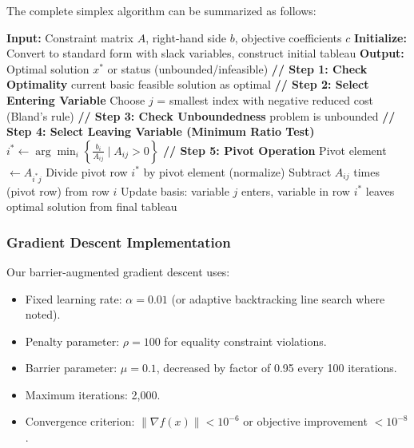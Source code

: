 \documentclass[11pt]{article}
\begin{document}
The complete simplex algorithm can be summarized as follows:

\begin{algorithm}[h]
\caption{Simplex Method for Linear Programming}
\begin{algorithmic}[1]
\State \textbf{Input:} Constraint matrix \(A\), right-hand side \(b\), objective coefficients \(c\)
\State \textbf{Initialize:} Convert to standard form with slack variables, construct initial tableau
\State \textbf{Output:} Optimal solution \(x^*\) or status (unbounded/infeasible)
\State
{}
    \State \textbf{// Step 1: Check Optimality}
        \State \Return current basic feasible solution as optimal
    \EndIf
    \State
    \State \textbf{// Step 2: Select Entering Variable}
    \State Choose \(j\) = smallest index with negative reduced cost (Bland's rule)
    \State
    \State \textbf{// Step 3: Check Unboundedness}
        \State \Return problem is unbounded
    \EndIf
    \State
    \State \textbf{// Step 4: Select Leaving Variable (Minimum Ratio Test)}
    \State \(i^* \gets \arg\min_i \left\{ \frac{b_i}{A_{ij}} \mid A_{ij} > 0 \right\}\)
    \State
    \State \textbf{// Step 5: Pivot Operation}
    \State Pivot element \(\gets A_{i^*j}\)
    \State Divide pivot row \(i^*\) by pivot element (normalize)
        \State Subtract \(A_{ij}\) times (pivot row) from row \(i\) 
    \EndFor
    \State Update basis: variable \(j\) enters, variable in row \(i^*\) leaves
\EndWhile
\State \Return optimal solution from final tableau
\end{algorithmic}
\end{algorithm}

\subsubsection{Gradient Descent Implementation}
Our barrier-augmented gradient descent uses:
\begin{itemize}
    \item Fixed learning rate: \(\alpha = 0.01\) (or adaptive backtracking line search where noted).
    \item Penalty parameter: \(\rho = 100\) for equality constraint violations.
    \item Barrier parameter: \(\mu = 0.1\), decreased by factor of 0.95 every 100 iterations.
    \item Maximum iterations: 2,000.
    \item Convergence criterion: \(\|\nabla f(x)\| < 10^{-6}\) or objective improvement \(< 10^{-8}\).
\end{itemize}
\end{document}
